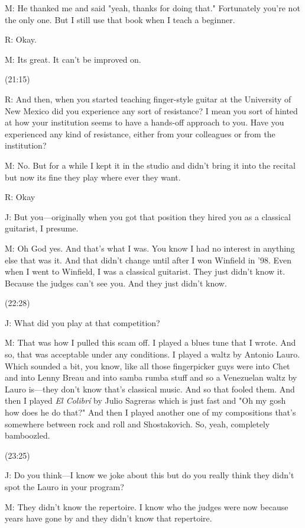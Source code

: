 \documentclass[11pt]{article}
\begin{document}
M: He thanked me and said "yeah, thanks for doing that." Fortunately you're not the only one. But I still use that book when I teach a beginner. 

R: Okay. 

M: Its great. It can't be improved on. 

(21:15)

R: And then, when you started teaching finger-style guitar at the University of New Mexico did you experience any sort of resistance? I mean you sort of hinted at how your institution seems to have a hands-off approach to you. Have you experienced any kind of resistance, either from your colleagues or from the institution? 

M: No. But for a while I kept it in the studio and didn't bring it into the recital but now its fine they play where ever they want. 

R: Okay

J: But you---originally when you got that position they hired you as a classical guitarist, I presume. 

M: Oh God yes. And that's what I was. You know I had no interest in anything else that was it. And that didn't change until after I won Winfield in '98. Even when I went to Winfield, I was a classical guitarist. They just didn't know it. Because the judges can't see you. And they just didn't know. 

(22:28)

J: What did you play at that competition?

M: That was how I pulled this scam off. I played a blues tune that I wrote. And so, that was acceptable under any conditions. I played a waltz by Antonio Lauro. Which sounded a bit, you know, like all those fingerpicker guys were into Chet and into Lenny Breau and into samba rumba stuff and so a Venezuelan waltz by Lauro is---they don't know that's classical music. And so that fooled them. And then I played \emph{El Colibrí} by Julio Sagreras which is just fast and "Oh my gosh how does he do that?" And then I played another one of my compositions that's somewhere between rock and roll and Shostakovich. So, yeah, completely bamboozled.

(23:25)

J: Do you think—I know we joke about this but do you really think they didn't spot the Lauro in your program?

M: They didn't know the repertoire. I know who the judges were now because years have gone by and they didn't know that repertoire. 
\end{document}
